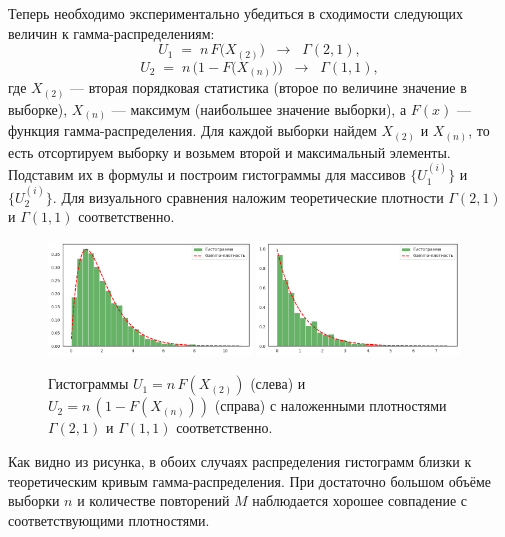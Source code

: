 \documentclass[a4paper,12pt]{article}
\begin{document}
Теперь необходимо экспериментально убедиться в сходимости следующих величин к гамма-распределениям:
\[
U_1 \;=\; n\,F\bigl(X_{(2)}\bigr) \;\;\xrightarrow{}\;\; \Gamma(2,1),
\]
\[
U_2 \;=\; n\,\bigl(1 - F\bigl(X_{(n)}\bigr)\bigr) \;\;\xrightarrow{}\;\; \Gamma(1,1),
\]
где $X_{(2)}$ --- вторая порядковая статистика (второе по величине значение в выборке), $X_{(n)}$ --- максимум (наибольшее значение выборки), а $F(x)$ --- функция гамма-распределения.
Для каждой выборки найдем $X_{(2)}$ и $X_{(n)}$, то есть отсортируем выборку и возьмем второй и максимальный элементы. Подставим их в формулы и построим гистограммы для массивов $\{U_1^{(i)}\}$ и $\{U_2^{(i)}\}$. Для визуального сравнения наложим теоретические плотности $\Gamma(2,1)$ и $\Gamma(1,1)$ соответственно.
\begin{figure}[H]
    \centering
    \includegraphics[width=0.48\textwidth]{images/U1.png}
    \quad
    \includegraphics[width=0.48\textwidth]{images/U2.png}
    \caption{Гистограммы $U_1 = n\,F(X_{(2)})$ (слева) и $U_2 = n\,(1-F(X_{(n)}))$ (справа) 
             с наложенными плотностями $\Gamma(2,1)$ и $\Gamma(1,1)$ соответственно.}
    \label{fig:U1_U2_gamma}
\end{figure}
Как видно из рисунка, в обоих случаях распределения гистограмм близки к теоретическим кривым гамма-распределения. При достаточно большом объёме выборки $n$ и количестве повторений $M$ наблюдается хорошее совпадение с соответствующими плотностями.
\end{document}
